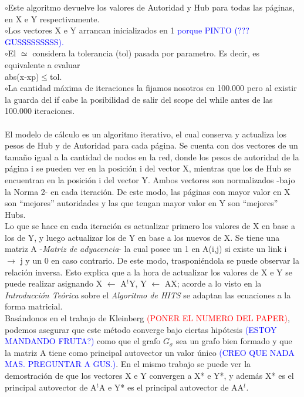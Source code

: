 \documentclass[a4paper]{article}
\begin{document}
$\circ$Este algoritmo devuelve los valores de Autoridad y Hub para todas las p\'aginas, en X e Y respectivamente.\\
\indent $\circ$Los vectores X e Y arrancan inicializados en 1 \textcolor{blue}{ porque PINTO (??? GUSSSSSSSSS).}\\
\indent $\circ$El $\simeq$ considera la tolerancia (tol) pasada por parametro. Es decir, es equivalente a evaluar \\ abs(x-xp)$\leq$tol. \\
\indent $\circ$La cantidad m\'axima de iteraciones la fijamos nosotros en 100.000 pero al existir la guarda del if cabe la posibilidad de salir del scope del while antes de las 100.000 iteraciones. \\
\\
\indent El modelo de c\'alculo es un algoritmo iterativo, el cual conserva y actualiza los pesos de Hub y de Autoridad para cada p\'agina. Se cuenta con dos vectores de un tama\~no igual a la cantidad de nodos en la red, donde los pesos de autoridad de la p\'agina i se pueden ver en la posici\'on i del vector X, mientras que los de Hub se encuentran en la posici\'on i del vector Y. Ambos vectores son normalizados -bajo la Norma 2- en cada iteraci\'on. De este modo, las p\'aginas con mayor valor en X son ``mejores'' autoridades y las que tengan mayor valor en Y son ``mejores'' Hubs. \\
\indent Lo que se hace en cada iteraci\'on es actualizar primero los valores de X en base a los de Y, y luego actualizar los de Y en base a los nuevos de X. Se tiene una matriz A -\textit{Matriz de adyacencia}- la cual posee un 1 en A(i,j) si existe un link i $\rightarrow$ j y un 0 en caso contrario. De este modo, trasponi\'endola se puede observar la relaci\'on inversa. Esto explica que a la hora de actualizar los valores de X e Y se puede realizar asignando X $\leftarrow$ A$^t$Y, Y $\leftarrow$ AX; acorde a lo visto en la \emph{Introducci\'on Te\'orica} sobre el \textit{Algoritmo de HITS} se adaptan las ecuaciones a la forma matricial.\\ 
\indent Bas\'andonos en el trabajo de Kleinberg \textcolor{red}{(PONER EL NUMERO DEL PAPER)}, podemos asegurar que este m\'etodo converge bajo ciertas hip\'otesis \textcolor{blue}{(ESTOY MANDANDO FRUTA?)} como que el grafo $G_\sigma$ sea un grafo bien formado y que la matriz A tiene como principal autovector un valor \'unico \textcolor{blue}{(CREO QUE NADA MAS. PREGUNTAR A GUS.)}. En el mismo trabajo se puede ver la demostraci\'on  de que los vectores X e Y convergen a X* e Y*, y adem\'as X* es el principal autovector de A$^t$A e Y* es el principal autovector de AA$^t$.\\
\end{document}
